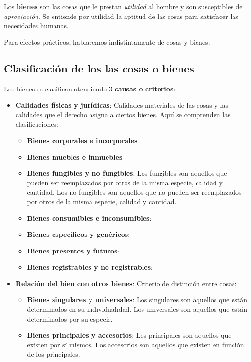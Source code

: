 \documentclass{templateNote}
\begin{document}
Los \textbf{bienes} son las cosas que le prestan \textit{utilidad} al hombre y son susceptibles de \textit{apropiación}. Se entiende por utilidad la aptitud de las cosas para satisfacer las necesidades humanas.

Para efectos prácticos, hablaremos indistintamente de cosas y bienes.

\subsection{Clasificación de los las cosas o bienes}

Los bienes se clasifican atendiendo 3 \textbf{causas o criterios}:
\begin{itemize}
    \item \textbf{Calidades físicas y jurídicas}: Calidades materiales de las cosas y las calidades que el derecho asigna a ciertos bienes. Aquí se comprenden las clasificaciones:
    \begin{itemize}
        \item \textbf{Bienes corporales e incorporales}
        \item \textbf{Bienes muebles e inmuebles}
        \item \textbf{Bienes fungibles y no fungibles}: Los fungibles son aquellos que pueden ser reemplazados por otros de la misma especie, calidad y cantidad. Los no fungibles son aquellos que no pueden ser reemplazados por otros de la misma especie, calidad y cantidad.
        \item \textbf{Bienes consumibles e inconsumibles}: 
        \item \textbf{Bienes específicos y genéricos}:
        \item \textbf{Bienes presentes y futuros}: 
        \item \textbf{Bienes registrables y no registrables}: 
    \end{itemize}
    \item \textbf{Relación del bien con otros bienes}: Criterio de distinción entre cosas:
    \begin{itemize}
        \item \textbf{Bienes singulares y universales}: Los singulares son aquellos que están determinados en su individualidad. Los universales son aquellos que están determinados por su especie.
        \item \textbf{Bienes principales y accesorios}: Los principales son aquellos que existen por sí mismos. Los accesorios son aquellos que existen en función de los principales.

\end{itemize}
\end{itemize}
\end{document}
